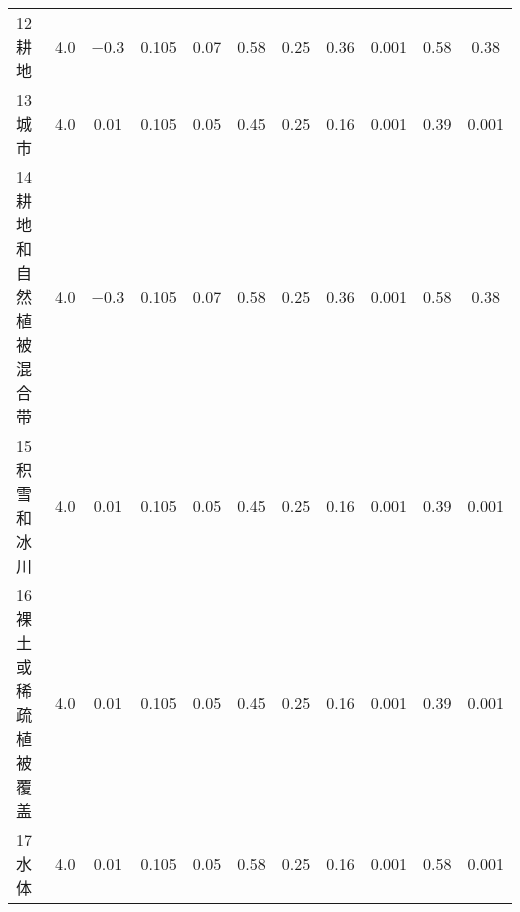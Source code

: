 \begin{landscape}
\begin{table}[htbp]
\begin{tabular}{@{}lcccccccccc@{}}
      12 耕地                 & 4.0              & \num{-0.3        }    & 0.105                    & 0.07                     & 0.58                     & 0.25                     & 0.36                     & 0.001                    & 0.58                     & 0.38                     \\
      13 城市                 & 4.0              & \num { 0.01}          & 0.105                    & 0.05                     & 0.45                     & 0.25                     & 0.16                     & 0.001                    & 0.39                     & 0.001                    \\
      14 耕地和自然植被混合带 & 4.0              & \num { -0.3}          & 0.105                    & 0.07                     & 0.58                     & 0.25                     & 0.36                     & 0.001                    & 0.58                     & 0.38                     \\
      15 积雪和冰川           & 4.0              & \num { 0.01}          & 0.105                    & 0.05                     & 0.45                     & 0.25                     & 0.16                     & 0.001                    & 0.39                     & 0.001                    \\
      16 裸土或稀疏植被覆盖   & 4.0              & \num { 0.01}          & 0.105                    & 0.05                     & 0.45                     & 0.25                     & 0.16                     & 0.001                    & 0.39                     & 0.001                    \\
      17 水体                 & 4.0              & 0.01                  & 0.105                    & 0.05                     & 0.58                     & 0.25                     & 0.16                     & 0.001                    & 0.58                     & 0.001                    \\ \bottomrule
    \end{tabular}
  \end{table}
\end{landscape}

